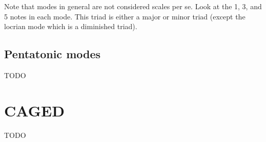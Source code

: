 \clearpage

Note that modes in general are not considered scales per se. Look at the 1, 3, and 5 notes in each mode. This triad is either a major or minor triad (except the locrian mode which is a diminished triad).

\fi

\subsection{Pentatonic modes}
TODO

\section{CAGED}
TODO